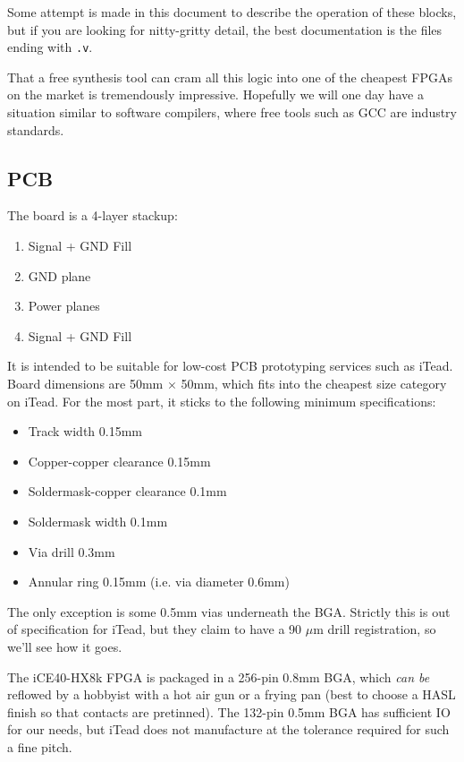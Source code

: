 \documentclass{article}
\begin{document}
Some attempt is made in this document to describe the operation of these blocks, but if you are looking for nitty-gritty detail, the best documentation is the files ending with \texttt{.v}.

That a free synthesis tool can cram all this logic into one of the cheapest FPGAs on the market is tremendously impressive. Hopefully we will one day have a situation similar to software compilers, where free tools such as GCC are industry standards.

\subsection{PCB}

The board is a 4-layer stackup:

\begin{enumerate}
\item Signal + GND Fill
\item GND plane
\item Power planes
\item Signal + GND Fill
\end{enumerate}

It is intended to be suitable for low-cost PCB prototyping services such as iTead. Board dimensions are 50mm $\times$ 50mm, which fits into the cheapest size category on iTead. For the most part, it sticks to the following minimum specifications:

\begin{itemize}
\item Track width 0.15mm
\item Copper-copper clearance 0.15mm
\item Soldermask-copper clearance 0.1mm
\item Soldermask width 0.1mm
\item Via drill 0.3mm
\item Annular ring 0.15mm (i.e. via diameter 0.6mm)
\end{itemize}

The only exception is some 0.5mm vias underneath the BGA. Strictly this is out of specification for iTead, but they claim to have a 90 $\mu$m drill registration, so we'll see how it goes.

The iCE40-HX8k FPGA is packaged in a 256-pin 0.8mm BGA, which \textit{can be} reflowed by a hobbyist with a hot air gun or a frying pan (best to choose a HASL finish so that contacts are pretinned). The 132-pin 0.5mm BGA has sufficient IO for our needs, but iTead does not manufacture at the tolerance required for such a fine pitch.
\end{document}
